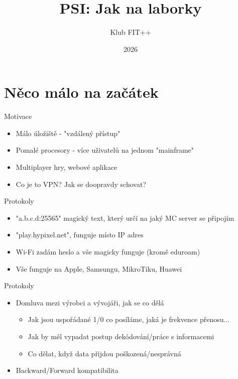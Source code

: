 \documentclass[aspectratio=1610]{beamer}
\title{PSI: Jak na laborky}
\author{Klub FIT++}
\date{2026}
\begin{document}
\maketitle

\section{Něco málo na začátek}

\begin{frame}{Motivace}

\begin{itemize}
  \item Málo úložiště - "vzdálený přístup"
  \item Pomalé procesory - více uživatelů na jednom "mainframe"
  \item Multiplayer hry, webové aplikace
  \item Co je to VPN? Jak se doopravdy schovat?
\end{itemize}

\end{frame}

\begin{frame}{Protokoly}

\begin{itemize}
  \item "a.b.c.d:25565" magický text, který určí na jaký MC server se připojím
  \item "play.hypixel.net", funguje místo IP adres
  \item Wi-Fi zadám heslo a vše magicky funguje (kromě eduroam)
  \item Vše funguje na Apple, Samsungu, MikroTiku, Huawei
\end{itemize}

\end{frame}

\begin{frame}{Protokoly}

\begin{itemize}
  \item Domluva mezi výrobci a vývojáři, jak se co dělá
    \begin{itemize}
      \item Jak jsou uspořádané 1/0 co posíláme, jaká je frekvence přenosu...
      \item Jak by měl vypadat postup dekódování/práce s informacemi
      \item Co dělat, když data přijdou poškozená/nesprávná
    \end{itemize}
  \item Backward/Forward kompatibilita
\end{itemize}

\end{frame}
\end{document}
